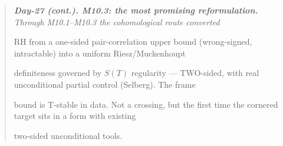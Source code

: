\documentclass[10pt]{article}
\begin{document}
\begin{quote}\itshape
\textbf{Day-27 (cont.). M10.3: the most promising reformulation.} Through M10.1--M10.3 the cohomological route converted\par
RH from a one-sided pair-correlation upper bound (wrong-signed, intractable) into a uniform Riesz/Muckenhoupt\par
definiteness governed by $S(T)$ regularity --- TWO-sided, with real unconditional partial control (Selberg). The frame\par
bound is T-stable in data. Not a crossing, but the first time the cornered target sits in a form with existing\par
two-sided unconditional tools.\par
\end{quote}
\end{document}
